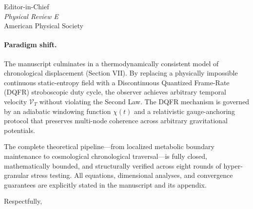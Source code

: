 \documentclass[11pt, letterpaper]{letter}
\begin{document}
\begin{letter}{Editor-in-Chief \\ \textit{Physical Review E} \\ American Physical Society}
\paragraph{Paradigm shift.}
The manuscript culminates in a thermodynamically consistent model of chronological displacement (Section VII). By replacing a physically impossible continuous static-entropy field with a Discontinuous Quantized Frame-Rate (DQFR) stroboscopic duty cycle, the observer achieves arbitrary temporal velocity $\mathcal{V}_T$ without violating the Second Law. The DQFR mechanism is governed by an adiabatic windowing function $\chi(t)$ and a relativistic gauge-anchoring protocol that preserves multi-node coherence across arbitrary gravitational potentials.

The complete theoretical pipeline---from localized metabolic boundary maintenance to cosmological chronological traversal---is fully closed, mathematically bounded, and structurally verified across eight rounds of hyper-granular stress testing. All equations, dimensional analyses, and convergence guarantees are explicitly stated in the manuscript and its appendix.

\closing{Respectfully,}

\end{letter}
\end{document}
